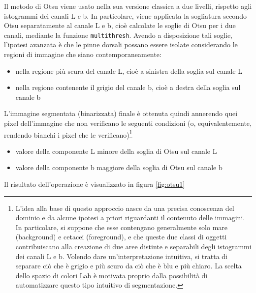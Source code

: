 Il metodo di Otsu viene usato nella sua versione classica a due livelli, rispetto agli istogrammi dei canali L e b. In particolare, viene applicata la sogliatura secondo Otsu separatamente al canale L e b, cioè calcolate le soglie di Otsu per i due canali, mediante la funzione \verb|multithresh|.
Avendo a disposizione tali soglie, l’ipotesi avanzata è che le pinne dorsali possano essere
isolate considerando le regioni di immagine che siano contemporaneamente:
\begin{itemize}
\item nella regione più scura del canale L, cioè a sinistra della soglia sul canale L
\item nella regione contenente il grigio del canale b, cioè a destra della soglia sul canale b
\end{itemize}
L'immagine segmentata (binarizzata) finale è ottenuta quindi annerendo quei pixel dell'immagine che non verificano le seguenti condizioni (o, equivalentemente, rendendo bianchi i pixel che le verificano)\footnote{L’idea alla base di questo approccio nasce da una precisa conoscenza del dominio e da alcune ipotesi a priori riguardanti il contenuto delle immagini. In particolare, si suppone
che esse contengano generalmente solo mare (background) e cetacei (foreground),
e che queste due classi di oggetti contribuiscano alla creazione di due aree distinte e
separabili degli istogrammi dei canali L e b. Volendo dare un’interpretazione intuitiva,
si tratta di separare ciò che è grigio e più scuro da ciò che è blu e più chiaro. La scelta
dello spazio di colori Lab è motivata proprio dalla possibilità di automatizzare questo
tipo intuitivo di segmentazione.}
\begin{itemize}
\item valore della componente L minore della soglia di Otsu sul canale L
\item valore della componente b maggiore della soglia di Otsu sul canale b
\end{itemize}

\noindent Il risultato dell'operazione è visualizzato in figura \ref{fig:otsu1}

